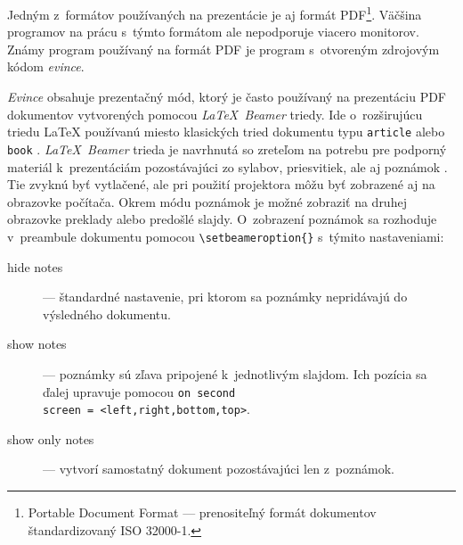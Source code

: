 \documentclass[12pt,oneside,final]{fithesis2}
\begin{document}
Jedným z~formátov používaných na prezentácie je aj formát PDF\footnote{Portable Document Format --- prenositeľný formát dokumentov štandardizovaný ISO 32000-1.}. Väčšina programov na prácu s~týmto formátom ale nepodporuje viacero monitorov. Známy program používaný na formát PDF je program s~otvoreným zdrojovým kódom \emph{evince}.

\emph{Evince} obsahuje prezentačný mód, ktorý je často používaný na prezentáciu PDF dokumentov vytvorených pomocou \emph{\LaTeX~Beamer} triedy. Ide o~rozširujúcu triedu \LaTeX{} používanú miesto klasických tried dokumentu typu \texttt{article} alebo \texttt{book} \cite{abclatex}. \emph{\LaTeX~Beamer} trieda je navrhnutá so zreteľom na potrebu pre podporný materiál k~prezentáciám pozostávajúci zo sylabov, priesvitiek, ale aj poznámok \cite{beamer}. Tie zvyknú byť vytlačené, ale pri použití projektora môžu byť zobrazené aj na obrazovke počítača. Okrem módu poznámok je možné zobraziť na druhej obrazovke preklady alebo predošlé slajdy. O~zobrazení poznámok sa rozhoduje v~preambule dokumentu pomocou \verb|\setbeameroption{}| s~týmito nastaveniami:
\begin{description}
\item[hide notes] --- štandardné nastavenie, pri ktorom sa poznámky nepridávajú do výsledného dokumentu.
\item[show notes] --- poznámky sú zľava pripojené k~jednotlivým slajdom. Ich pozícia sa ďalej upravuje pomocou \texttt{on second \\ screen = <left,right,bottom,top>}.
\item[show only notes]  --- vytvorí samostatný dokument pozostávajúci len z~poznámok.
\end{description}
\end{document}
